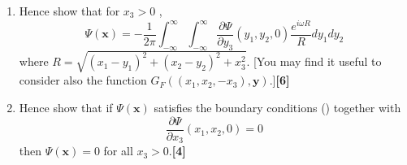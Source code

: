 \documentclass[a4paper]{article}
\begin{document}
\begin{qns}
\begin{enumerate}[label=(\roman*)]
$$\begin{array}{ll}
      0 & \text{ for }\mathbf{x}\text{ such that }x_3<0
        \end{array}
    \right.$$
\item Hence show that for $x_3 > 0$ ,
$$\Psi(\mathbf{x})=-\frac{1}{2\pi}\int_{-\infty}^\infty\int_{-\infty}^\infty\frac{\partial\Psi}{\partial y_3}(y_1,y_2,0)\frac{e^{i\omega R}}{R}dy_1dy_2$$
where $R=\sqrt{(x_1-y_1)^2+(x_2-y_2)^2+x_3^2}$. [You may find it useful to consider also the function $G_F ((x_1, x_2,−x_3), \mathbf{y})$.]\hfill\textbf{[6]}
\item Hence show that if $\Psi(\mathbf{x})$ satisfies the boundary conditions (\dag) together with
$$\frac{\partial\Psi}{\partial x_3}(x_1,x_2,0)=0$$
then $\Psi(\mathbf{x}) = 0$ for all $x_3 > 0$.\hfill\textbf{[4]}
\end{enumerate}
\end{qns}
\newpage
\end{document}
